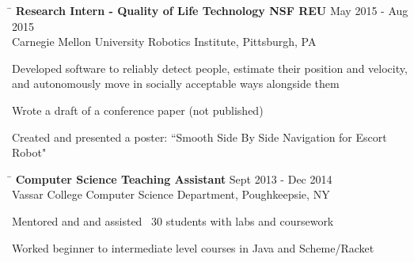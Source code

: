 \documentclass{res}
\begin{document}
\begin{resume}
{    \vspace{-12pt}
    \begin{tabbing}
      \hspace{5.65in}\=  \kill %
      {\bf Research Intern - Quality of Life Technology NSF REU}
      \>May 2015 - Aug 2015\\
      Carnegie Mellon University Robotics Institute, Pittsburgh, PA\\     
    \end{tabbing}
    \vspace{-24pt}      %
    \begin{list}{\bf{-}}{}
      \setlength{\itemsep}{-2pt}
      \item Developed software to reliably detect people, estimate their
            position and velocity,\\ and autonomously move in socially
            acceptable ways alongside them
      \item Wrote a draft of a conference paper (not published)
      \item Created and presented a poster: ``Smooth Side By Side Navigation for
            Escort Robot"
    \end{list}

    \vspace{-12pt}
    \begin{tabbing}
      \hspace{5.65in}\=  \kill %
      {\bf Computer Science Teaching Assistant}
      \>Sept 2013 - Dec 2014\\
      Vassar College Computer Science Department, Poughkeepsie, NY\\     
    \end{tabbing}
    \vspace{-24pt}      %
    \begin{list}{\bf{-}}{}
      \setlength{\itemsep}{-2pt}
      \item Mentored and and assisted ~30 students with labs and coursework
      \item Worked beginner to intermediate level courses in Java and
            Scheme/Racket
    \end{list}

}
\end{resume}
\end{document}
